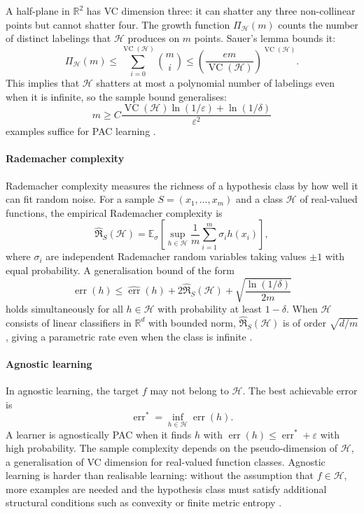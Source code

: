 A half-plane in $\mathbb R^2$ has VC dimension three: it can shatter any three non-collinear points but cannot shatter four. The growth function $\Pi_{\mathcal H}(m)$ counts the number of distinct labelings that $\mathcal H$ produces on $m$ points. Sauer's lemma bounds it:
\[
\Pi_{\mathcal H}(m)\leq\sum_{i=0}^{\operatorname{VC}(\mathcal H)}\binom{m}{i}\leq\left(\frac{em}{\operatorname{VC}(\mathcal H)}\right)^{\operatorname{VC}(\mathcal H)}.
\]
This implies that $\mathcal H$ shatters at most a polynomial number of labelings even when it is infinite, so the sample bound generalises:
\[
m\geq C\frac{\operatorname{VC}(\mathcal H)\ln(1/\varepsilon)+\ln(1/\delta)}{\varepsilon^2}
\]
examples suffice for PAC learning \cite{colt_ref2}.

\paragraph{Rademacher complexity}
Rademacher complexity measures the richness of a hypothesis class by how well it can fit random noise. For a sample $S=(x_1,\ldots,x_m)$ and a class $\mathcal H$ of real-valued functions, the empirical Rademacher complexity is
\[
\hat{\mathfrak R}_S(\mathcal H)=\mathbb E_\sigma\left[\sup_{h\in\mathcal H}\frac{1}{m}\sum_{i=1}^m\sigma_i h(x_i)\right],
\]
where $\sigma_i$ are independent Rademacher random variables taking values $\pm1$ with equal probability. A generalisation bound of the form
\[
\operatorname{err}(h)\leq\hat{\operatorname{err}}(h)+2\hat{\mathfrak R}_S(\mathcal H)+\sqrt{\frac{\ln(1/\delta)}{2m}}
\]
holds simultaneously for all $h\in\mathcal H$ with probability at least $1-\delta$. When $\mathcal H$ consists of linear classifiers in $\mathbb R^d$ with bounded norm, $\hat{\mathfrak R}_S(\mathcal H)$ is of order $\sqrt{d/m}$, giving a parametric rate even when the class is infinite \cite{colt_ref4}.

\paragraph{Agnostic learning}
In agnostic learning, the target $f$ may not belong to $\mathcal H$. The best achievable error is
\[
\operatorname{err}^*=\inf_{h\in\mathcal H}\operatorname{err}(h).
\]
A learner is agnostically PAC when it finds $h$ with $\operatorname{err}(h)\leq\operatorname{err}^*+\varepsilon$ with high probability. The sample complexity depends on the pseudo-dimension of $\mathcal H$, a generalisation of VC dimension for real-valued function classes. Agnostic learning is harder than realisable learning: without the assumption that $f\in\mathcal H$, more examples are needed and the hypothesis class must satisfy additional structural conditions such as convexity or finite metric entropy \cite{colt_ref2}.

